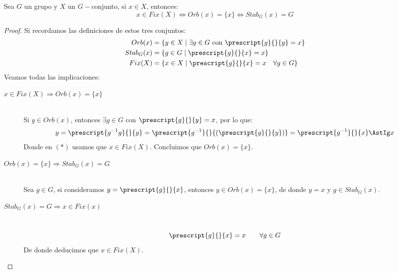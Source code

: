 \begin{prop}
    Sea $G$ un grupo y $X$ un $G-$conjunto, si $x\in X$, entonces:
    \begin{equation*}
        x\in Fix(X) \Longleftrightarrow Orb(x) = \{x\} \Longleftrightarrow Stab_G(x) = G
    \end{equation*}
    \begin{proof}
        Si recordamos las definiciones de estos tres conjuntos:
        \begin{align*}
            Orb(x) &= \{y\in X \mid \exists g\in G \text{\ con\ } \prescript{g}{}{y} = x\} \\
            Stab_G(x) &= \{g\in G \mid \prescript{g}{}{x} = x\} \\
            Fix(X) &= \{x\in X \mid \prescript{g}{}{x} = x \quad \forall g\in G\}
        \end{align*}
        Veamos todas las implicaciones:
        \begin{description}
            \item [$x\in Fix(X) \Longrightarrow Orb(x) = \{x\}$]~\\
                Si $y\in Orb(x)$, entonces $\exists g\in G$ con $\prescript{g}{}{y}= x$, por lo que:
                \begin{equation*}
                    y = \prescript{g^{-1}g}{}{y} = \prescript{g^{-1}}{}{(\prescript{g}{}{y})} = \prescript{g^{-1}}{}{x} \AstIg x
                \end{equation*}
                Donde en $(\ast)$ usamos que $x\in Fix(X)$. Concluimos que $Orb(x) = \{x\}$.
            \item [$Orb(x) = \{x\} \Longrightarrow Stab_G(x) = G$]~\\
                Sea $g\in G$, si consideramos  $y = \prescript{g}{}{x}$, entonces $y\in Orb(x) = \{x\}$, de donde $y = x$ y $g\in Stab_G(x)$.
            \item [$Stab_G(x) = G \Longrightarrow x\in Fix(x)$]~\\
                \begin{equation*}
                    \prescript{g}{}{x} = x \qquad \forall g\in G
                \end{equation*}
                De donde deducimos que $x\in Fix(X)$.
        \end{description}
    \end{proof}
\end{prop}

